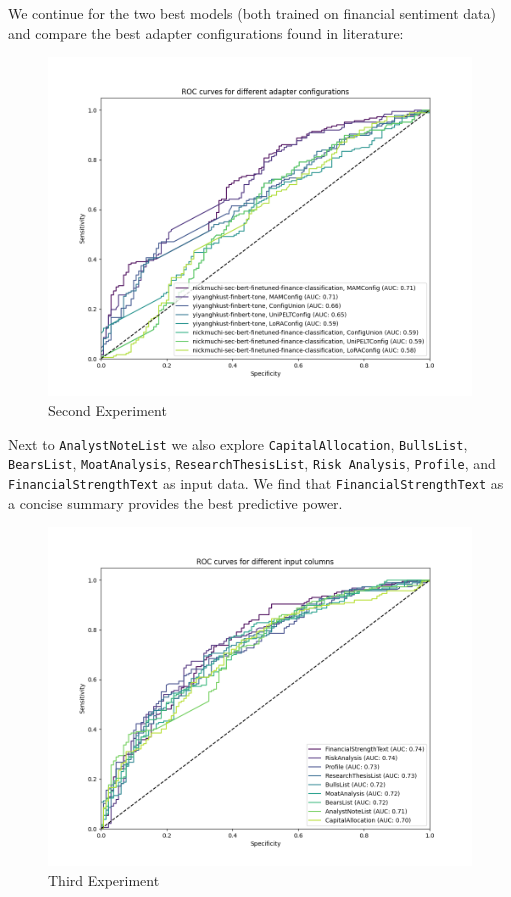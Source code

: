 \documentclass[conference]{IEEEtran}
\begin{document}
We continue for the two best models (both trained on financial sentiment data) and compare the best adapter configurations found in literature:

\begin{figure}[H]
    \centering
    \includegraphics[width=.85\linewidth]{../3. evaluation/roc_curves/Second Experiment.png}
    \caption[Second Experiment]{Second Experiment}
    \label{fig:Secondexp}
\end{figure}

Next to \texttt{AnalystNoteList} we also explore  \texttt{CapitalAllocation}, \texttt{BullsList}, \texttt{BearsList}, \texttt{MoatAnalysis}, \texttt{ResearchThesisList},  \texttt{Risk Analysis}, \texttt{Profile}, and  \texttt{FinancialStrengthText} as input data. We find that \texttt{FinancialStrengthText} as a concise summary provides the best predictive power.

\begin{figure}[H]
    \centering
    \includegraphics[width=.85\linewidth]{../3. evaluation/roc_curves/Third Experiment.png}
    \caption[Third Experiment]{Third Experiment}
    \label{fig:Thirdexp}
\end{figure}
\end{document}
